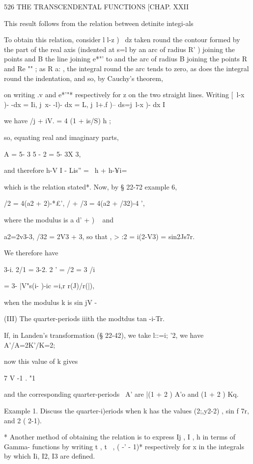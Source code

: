 526 THE TRANSCENDENTAL FUNCTIONS [CHAP. XXII 

This result follows from the relation between detinite integi-als 

To obtain this relation, consider l l-z )~ dz taken round the contour formed by the 
part of the real axis (indented at s=l by an arc of radius R' ) joining the points and 
B the line joining  e*"' to and the arc of radius B joining the points R and Re ""  ; as 
R a: , the integral round the arc tends to zero, as does the integral round the indentation, 
and so, by Cauchy's theorem, 

on writing .v and  e*'"* respectively for z on the two straight lines. 
Writing 
[\ l-x )- -dx = Ii, j\ x- -l)- dx = L, j\ l+.f )-- ds=j\ l-x )- dx I  

we have /j + iV. = 4 (1 + is/S) h ; 

so, equating real and imaginary parts, 

A = 5- 3 5 - 2 = 5- 3X 3, 

and therefore h-V I - Lis''  = \ h + h-¥i=  

which is the relation stated*. 
Now, by § 22-72 example 6, 

/2 = 4(a2 +  2)-*£', /  + /3 = 4(a2 + /32)-4 ', 

where the modulus is a  d' +  ) ~   and 

a2=2v3-3, /32 = 2V3 + 3, 
so that , > :2 = i(2-V3) = sin2Js7r. 

We therefore have 

3-i. 2/1 = 3-2. 2 ' = /2 = 3 /i 

= 3- |V"s(i- )-ic =i,r r(J)/r(|), 

when the modulus k is sin jV - 

(III) The quarter-periods iiith the modtdus tan -i-Tr. 

If, in Landen's transformation (§ 22-42), we take l::=i; '2, we have A'/A=2K'/K=2; 



now this value of k gives 



7 V -1 . "1 



and the corresponding quarter-periods \, A' are |(1 + 2  ) A'o and (1 + 2  ) Kq. 

Example 1. Discuss the quarter-i)eriods when k has the values (2;,y2-2) , sin f 7r, 
and 2 ( 2-1). 

* Another method of obtaining the relation is to express Ij , I , h in terms of Gamma- 
functions by writing t  , t~ , ( -' - 1)* respectively for x in the integrals by which Ii, I2, I3 are 
defined. 




